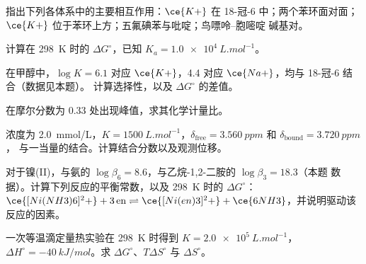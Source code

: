 \begin{exercise}[$\star$]\label{exo:b3:supramolecular:1}
指出下列各体系中的主要相互作用：$\ce{K+}$ 在 18-冠-6 中；两个苯环面对面；
$\ce{K+}$ 位于苯环上方；五氟碘苯与吡啶；鸟嘌呤–胞嘧啶
碱基对。
\end{exercise}

\begin{exercise}[$\star$]\label{exo:b3:supramolecular:2}
计算在 \qty{298}{K} 时的 $\Delta G^\circ$，已知 $K_a = \qty{1.0e4}{L.mol^{-1}}$。
\end{exercise}

\begin{exercise}[$\star$]\label{exo:b3:supramolecular:3}
在甲醇中，$\log K = 6.1$ 对应 $\ce{K+}$，4.4 对应 $\ce{Na+}$，均与 18-冠-6 结合（数据见本题）。
计算选择性，以及 $\Delta G^\circ$ 的差值。
\end{exercise}

\begin{exercise}[$\star$]\label{exo:b3:supramolecular:4}
在摩尔分数为 0.33 处出现峰值，求其化学计量比。
\end{exercise}

\begin{exercise}[$\star\star$]\label{exo:b3:supramolecular:5}
浓度为 \qty{2.0}{mmol/L}，$K = \qty{1500}{L.mol^{-1}}$，$\delta_{\mathrm{free}} = \qty{3.560}{ppm}$ 和 $\delta_{\mathrm{bound}} = \qty{3.720}{ppm}$，
与一当量的结合。计算结合分数以及观测位移。
\end{exercise}

\begin{exercise}[$\star\star$]\label{exo:b3:supramolecular:6}
对于镍(II)，与氨的 $\log\beta_6 = 8.6$，与乙烷-1,2-二胺的 $\log\beta_3 = 18.3$（本题
数据）。计算下列反应的平衡常数，以及 \qty{298}{K} 时的 $\Delta G^\circ$：
$\ce{[Ni(NH3)6]^2+} + 3\,\mathrm{en} \rightleftharpoons \ce{[Ni(en)3]^2+} + \ce{6NH3}$，并说明驱动该反应的因素。
\end{exercise}

\begin{exercise}[$\star\star$]\label{exo:b3:supramolecular:7}
一次等温滴定量热实验在 \qty{298}{K} 时得到 $K = \qty{2.0e5}{L.mol^{-1}}$，$\Delta H^\circ = \qty{-40}{kJ/mol}$。求 $\Delta G^\circ$、$T\Delta S^\circ$ 与
$\Delta S^\circ$。
\end{exercise}

